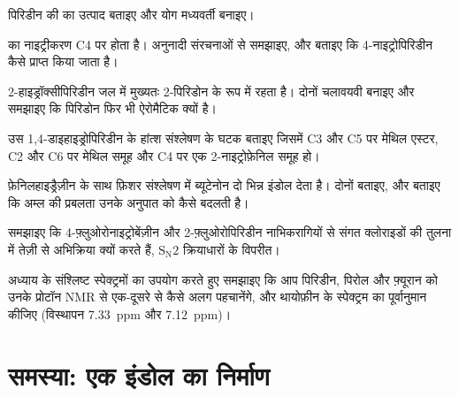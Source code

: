 \begin{exercise}[$\star\star$]\label{exo:b3:heterocycles:6}
पिरिडीन की  का उत्पाद बताइए और योग
मध्यवर्ती बनाइए।
\end{exercise}

\begin{exercise}[$\star\star$]\label{exo:b3:heterocycles:7}
 का नाइट्रीकरण C4 पर होता है। अनुनादी संरचनाओं से समझाइए, और बताइए कि
4-नाइट्रोपिरिडीन कैसे प्राप्त किया जाता है।
\end{exercise}

\begin{exercise}[$\star\star$]\label{exo:b3:heterocycles:8}
2-हाइड्रॉक्सीपिरिडीन जल में मुख्यतः 2-पिरिडोन के रूप में रहता है। दोनों चलावयवी बनाइए और
समझाइए कि पिरिडोन फिर भी ऐरोमैटिक क्यों है।
\end{exercise}

\begin{exercise}[$\star\star$]\label{exo:b3:heterocycles:9}
उस 1,4-डाइहाइड्रोपिरिडीन के हांत्श संश्लेषण के घटक बताइए जिसमें
C3 और C5 पर मेथिल एस्टर, C2 और C6 पर मेथिल समूह और C4 पर एक 2-नाइट्रोफ़ेनिल समूह
हो।
\end{exercise}

\begin{exercise}[$\star\star\star$]\label{exo:b3:heterocycles:10}
फ़ेनिलहाइड्रैज़ीन के साथ फ़िशर संश्लेषण में ब्यूटेनोन दो भिन्न इंडोल देता है।
दोनों बताइए, और बताइए कि अम्ल की प्रबलता उनके अनुपात को कैसे बदलती है।
\end{exercise}

\begin{exercise}[$\star\star\star$]\label{exo:b3:heterocycles:11}
समझाइए कि 4-फ़्लुओरोनाइट्रोबेंज़ीन और 2-फ़्लुओरोपिरिडीन नाभिकरागियों से संगत
क्लोराइडों की तुलना में तेज़ी से अभिक्रिया क्यों करते हैं, $\mathrm S_\mathrm N2$ क्रियाधारों के विपरीत।
\end{exercise}

\begin{exercise}[$\star\star\star$]\label{exo:b3:heterocycles:12}
अध्याय के संश्लिष्ट स्पेक्ट्रमों का उपयोग करते हुए समझाइए कि आप पिरिडीन,
पिरोल और फ़्यूरान को उनके प्रोटॉन NMR से एक-दूसरे से कैसे अलग पहचानेंगे, और
थायोफ़ीन के स्पेक्ट्रम का पूर्वानुमान कीजिए (विस्थापन \qty{7.33}{ppm} और \qty{7.12}{ppm})।
\end{exercise}

\section{समस्या: एक इंडोल का निर्माण}

